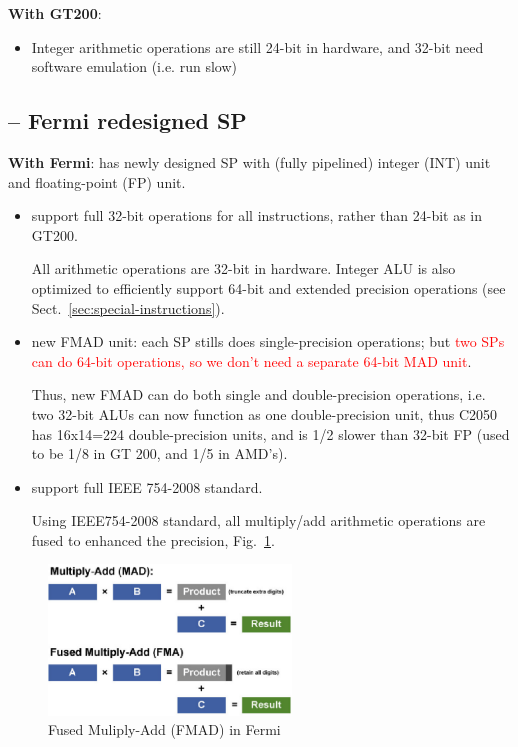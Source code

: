 {\bf With GT200}:
\begin{itemize}
\item Integer arithmetic operations are still 24-bit in hardware, and
  32-bit need software emulation (i.e. run slow)
\end{itemize}

\subsection{-- Fermi redesigned SP}
\label{sec:SP-Fermi}

{\bf With Fermi}: has newly designed SP with (fully pipelined) integer (INT)
unit and floating-point (FP) unit.
    
    
\begin{itemize}
  
  \item   support full 32-bit operations for all instructions, rather than
  24-bit as in GT200.
    
  All arithmetic operations are 32-bit in hardware. Integer ALU is
  also optimized to efficiently support 64-bit and extended precision
  operations (see Sect.~\ref{sec:special-instructions}).
  
  \item   new FMAD unit: each SP stills does single-precision operations;
  but 
    \textcolor{red}{two SPs can do 64-bit operations, so we don't need
      a separate 64-bit MAD unit}.
      
 Thus, new FMAD can do both single and double-precision operations, i.e. two
 32-bit ALUs can now function as one double-precision unit, thus C2050 has
 16x14=224 double-precision units, and is 1/2 slower than 32-bit
  FP (used to be 1/8 in GT 200, and 1/5 in AMD's).
       
 \item support full IEEE 754-2008 standard.

    Using IEEE754-2008 standard, all multiply/add arithmetic
    operations are fused to enhanced the precision,
    Fig.~\ref{fig:FMAD}.

\end{itemize}

    \begin{figure}[hbt]
      \centerline{\includegraphics[height=4cm,
        angle=0]{./images/FMAD.eps}}
      \caption{Fused Muliply-Add (FMAD) in Fermi}
      \label{fig:FMAD}
    \end{figure}

